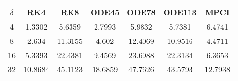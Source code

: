 \begin{tabular}{ccccccc}
\hline
$\delta$ & RK4 & RK8 & ODE45 & ODE78 & ODE113 & MPCI\\ 
\hline 
4 & 1.3302 & 5.6359 & 2.7993 & 5.9832 & 5.7381 & 6.4741 \\ 
8 & 2.634 & 11.3155 & 4.602 & 12.4069 & 10.9516 & 4.4711\\ 
16 & 5.3393 & 22.4381 & 9.4569 & 23.6988 & 22.3134 & 6.3653\\ 
32 & 10.8684 & 45.1123 & 18.6859 & 47.7626 & 43.5793 & 12.7938\\ 
\hline 
\end{tabular}